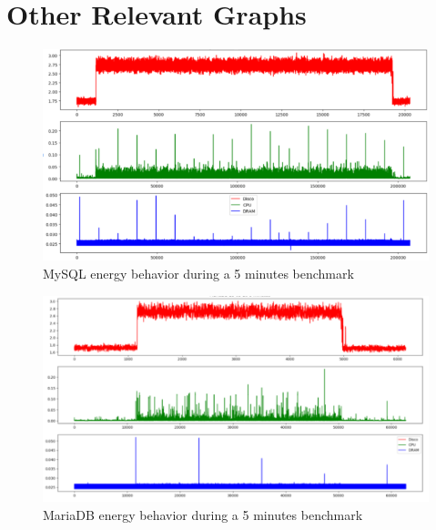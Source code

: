 \chapter{Other Relevant Graphs}
\label{app:results}

    
    
        \begin{figure}[h]
        \centering
        \includegraphics[width=1\columnwidth]{results/grafostempo/mysql5m.png}
        \caption{MySQL energy behavior during a 5 minutes benchmark}
        \label{fig:mysqltime5}
    \end{figure}
    
            \begin{figure}[h]
        \centering
        \includegraphics[width=1\columnwidth]{results/grafostempo/MariaDB.png}
        \caption{MariaDB energy behavior during a 5 minutes benchmark}
        \label{fig:mariadbtime5m}
    \end{figure}
        
